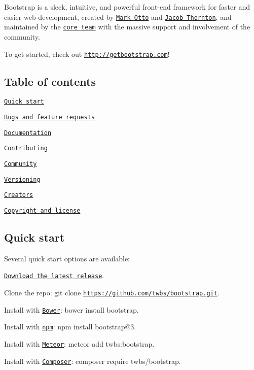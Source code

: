 \href{https://bootstrap-slack.herokuapp.com}{\tt }  \href{https://www.npmjs.com/package/bootstrap}{\tt } \href{https://travis-ci.org/twbs/bootstrap}{\tt } \href{https://david-dm.org/twbs/bootstrap#info=devDependencies}{\tt } \href{https://www.nuget.org/packages/Bootstrap}{\tt } \href{https://saucelabs.com/u/bootstrap}{\tt }

Bootstrap is a sleek, intuitive, and powerful front-\/end framework for faster and easier web development, created by \href{https://twitter.com/mdo}{\tt Mark Otto} and \href{https://twitter.com/fat}{\tt Jacob Thornton}, and maintained by the \href{https://github.com/orgs/twbs/people}{\tt core team} with the massive support and involvement of the community.

To get started, check out \href{http://getbootstrap.com}{\tt http\+://getbootstrap.\+com}!

\subsection*{Table of contents}


\begin{DoxyItemize}
\item \href{#quick-start}{\tt Quick start}
\item \href{#bugs-and-feature-requests}{\tt Bugs and feature requests}
\item \href{#documentation}{\tt Documentation}
\item \href{#contributing}{\tt Contributing}
\item \href{#community}{\tt Community}
\item \href{#versioning}{\tt Versioning}
\item \href{#creators}{\tt Creators}
\item \href{#copyright-and-license}{\tt Copyright and license}
\end{DoxyItemize}

\subsection*{Quick start}

Several quick start options are available\+:


\begin{DoxyItemize}
\item \href{https://github.com/twbs/bootstrap/archive/v3.3.7.zip}{\tt Download the latest release}.
\item Clone the repo\+: {\ttfamily git clone \href{https://github.com/twbs/bootstrap.git}{\tt https\+://github.\+com/twbs/bootstrap.\+git}}.
\item Install with \href{http://bower.io}{\tt Bower}\+: {\ttfamily bower install bootstrap}.
\item Install with \href{https://www.npmjs.com}{\tt npm}\+: {\ttfamily npm install bootstrap@3}.
\item Install with \href{https://www.meteor.com}{\tt Meteor}\+: {\ttfamily meteor add twbs\+:bootstrap}.
\item Install with \href{https://getcomposer.org}{\tt Composer}\+: {\ttfamily composer require twbs/bootstrap}.
\end{DoxyItemize}

